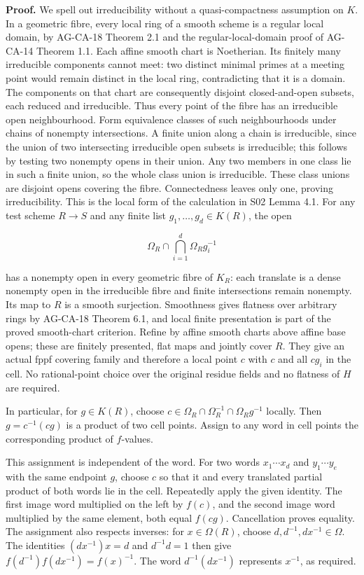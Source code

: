 \documentclass[11pt,a4paper,openany]{report}
\newcounter{none}
\begin{document}
\textbf{Proof.} We spell out irreducibility without a quasi-compactness assumption on \(K\). In a geometric fibre, every local ring of a smooth scheme is a regular local domain, by AG-CA-18 Theorem 2.1 and the regular-local-domain proof of AG-CA-14 Theorem 1.1. Each affine smooth chart is Noetherian. Its finitely many irreducible components cannot meet: two distinct minimal primes at a meeting point would remain distinct in the local ring, contradicting that it is a domain. The components on that chart are consequently disjoint closed-and-open subsets, each reduced and irreducible. Thus every point of the fibre has an irreducible open neighbourhood. Form equivalence classes of such neighbourhoods under chains of nonempty intersections. A finite union along a chain is irreducible, since the union of two intersecting irreducible open subsets is irreducible; this follows by testing two nonempty opens in their union. Any two members in one class lie in such a finite union, so the whole class union is irreducible. These class unions are disjoint opens covering the fibre. Connectedness leaves only one, proving irreducibility. This is the local form of the calculation in S02 Lemma 4.1. For any test scheme \(R\to S\) and any finite list \(g_1,\ldots,g_d\in K(R)\), the open

\[
\Omega_R\cap\bigcap_{i=1}^d\Omega_R g_i^{-1}
\]

has a nonempty open in every geometric fibre of \(K_R\): each translate is a dense nonempty open in the irreducible fibre and finite intersections remain nonempty. Its map to \(R\) is a smooth surjection. Smoothness gives flatness over arbitrary rings by AG-CA-18 Theorem 6.1, and local finite presentation is part of the proved smooth-chart criterion. Refine by affine smooth charts above affine base opens; these are finitely presented, flat maps and jointly cover \(R\). They give an actual fppf covering family and therefore a local point \(c\) with \(c\) and all \(cg_i\) in the cell. No rational-point choice over the original residue fields and no flatness of \(H\) are required.

In particular, for \(g\in K(R)\), choose \(c\in\Omega_R\cap\Omega_R^{-1}\cap\Omega_Rg^{-1}\) locally. Then \(g=c^{-1}(cg)\) is a product of two cell points. Assign to any word in cell points the corresponding product of \(f\)-values.

This assignment is independent of the word. For two words \(x_1\cdots x_d\) and \(y_1\cdots y_e\) with the same endpoint \(g\), choose \(c\) so that it and every translated partial product of both words lie in the cell. Repeatedly apply the given identity. The first image word multiplied on the left by \(f(c)\), and the second image word multiplied by the same element, both equal \(f(cg)\). Cancellation proves equality. The assignment also respects inverses: for \(x\in\Omega(R)\), choose \(d,d^{-1},dx^{-1}\in\Omega\). The identities \((dx^{-1})x=d\) and \(d^{-1}d=1\) then give \(f(d^{-1})f(dx^{-1})=f(x)^{-1}\). The word \(d^{-1}(dx^{-1})\) represents \(x^{-1}\), as required.
\end{document}
